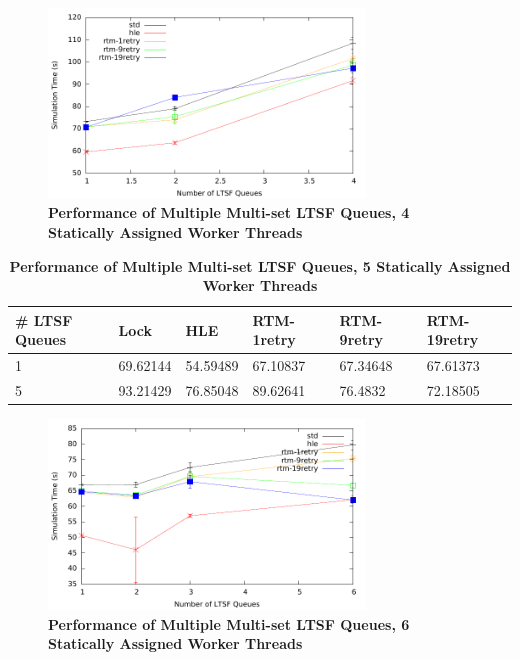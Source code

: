 \documentclass[11pt]{book}
\begin{document}
\begin{figure}
    \centering
    \graphicspath{ {./figures/} }
    \includegraphics[width=0.75\textwidth,keepaspectratio]{hugeepidemicsim-NOmig-timeVSschedQs-multiset-4thread}
    \caption{\textbf{Performance of Multiple Multi-set LTSF Queues, 4 Statically Assigned Worker Threads}}
    \label{fig:noThrMig_timeVSschq_4threads}
\end{figure}

\begin{table}
    \centering
    \begin{tabular}{l|p{2cm}|p{2cm}|p{2cm}|p{2cm}|p{2cm}}
        \textbf{\# LTSF Queues}&Lock &HLE &RTM-1retry &RTM-9retry &RTM-19retry \\
        \hline
        \midrule
            1 &69.62144  &54.59489 &67.10837 &67.34648 &67.61373\\ 
            5 &93.21429  &76.85048 &89.62641 &76.4832  &72.18505\\
    \end{tabular}
    \caption{\textbf{Performance of Multiple Multi-set LTSF Queues, 5 Statically Assigned Worker Threads}}
    \label{tab:noThrMig_5threadsXschq}
\end{table}

\begin{figure}
    \centering
    \graphicspath{ {./figures/} }
    \includegraphics[width=0.75\textwidth,keepaspectratio]{hugeepidemicsim-NOmig-timeVSschedQs-multiset-6thread}
    \caption{\textbf{Performance of Multiple Multi-set LTSF Queues, 6 Statically Assigned Worker Threads}}
    \label{fig:noThrMig_timeVSschq_6threads}
\end{figure}
\end{document}
